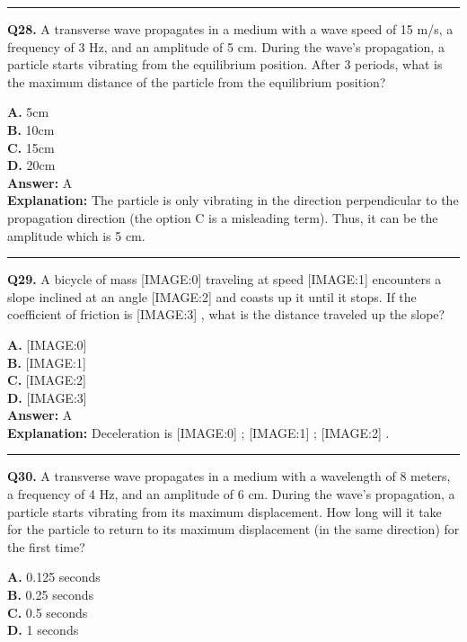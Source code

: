 \documentclass[12pt]{article}
\begin{document}
\hrule
\vspace{1em}


\noindent
\textbf{Q28.} A transverse wave propagates in a medium with a wave speed of 15 m/s, a frequency of 3 Hz, and an amplitude of 5 cm. During the wave's propagation, a particle starts vibrating from the equilibrium position. After 3 periods, what is the maximum distance of the particle from the equilibrium position?



\textbf{A.} 5cm \\
\textbf{B.} 10cm \\
\textbf{C.} 15cm \\
\textbf{D.} 20cm \\

\textbf{Answer:} A \\
\textbf{Explanation:} The particle is only vibrating in the direction perpendicular to the propagation direction (the option C is a misleading term). Thus, it can be the amplitude which is 5 cm.

\hrule
\vspace{1em}


\noindent
\textbf{Q29.} A bicycle of mass
[IMAGE:0]
traveling at speed
[IMAGE:1]
encounters a slope inclined at an angle
[IMAGE:2]
and coasts up it until it stops. If the coefficient of friction is
[IMAGE:3]
, what is the distance traveled up the slope?



\textbf{A.} [IMAGE:0] \\
\textbf{B.} [IMAGE:1] \\
\textbf{C.} [IMAGE:2] \\
\textbf{D.} [IMAGE:3] \\

\textbf{Answer:} A \\
\textbf{Explanation:} Deceleration is
[IMAGE:0]
;
[IMAGE:1]
;
[IMAGE:2]
.

\hrule
\vspace{1em}


\noindent
\textbf{Q30.} A transverse wave propagates in a medium with a wavelength of 8 meters, a frequency of 4 Hz, and an amplitude of 6 cm. During the wave's propagation, a particle starts vibrating from its maximum displacement. How long will it take for the particle to return to its maximum displacement (in the same direction) for the first time?



\textbf{A.} 0.125 seconds \\
\textbf{B.} 0.25 seconds \\
\textbf{C.} 0.5 seconds \\
\textbf{D.} 1 seconds \\
\end{document}
